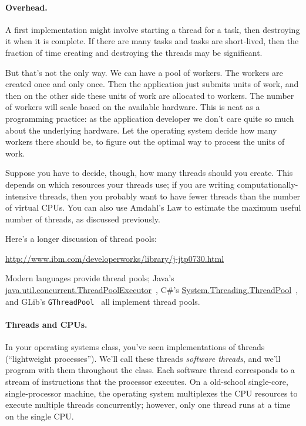 \documentclass[a4paper]{report}
\begin{document}
\paragraph{Overhead.}
A first implementation might involve starting a thread for a task, then destroying it when it is complete. If there are many tasks and tasks are short-lived, then the fraction of time creating and destroying the threads may be significant.

 But that's not the only way. We can have a pool of workers. The workers are created once and only once. Then the application just submits units of work, and then on the other side these units of work are allocated to workers. The number of workers will scale based on the available hardware. This is neat as a programming practice: as the application developer we don't care quite so much about the underlying hardware. Let the operating system decide how many workers there should be, to figure out the optimal way to process the units of work.
 
Suppose you have to decide, though, how many threads should you create.
This depends
on which resources your threads use; if you are writing
computationally-intensive threads, then you probably want to have
fewer threads than the number of virtual CPUs. You can also use
Amdahl's Law to estimate the maximum useful number of threads, as
discussed previously.

Here's a longer discussion of thread pools:

\begin{center}
\url{http://www.ibm.com/developerworks/library/j-jtp0730.html}
\end{center}

Modern languages provide thread pools; Java's
\url{java.util.concurrent.ThreadPoolExecutor}~\cite{java:threadpoolexecutor}, C\#'s
\url{System.Threading.ThreadPool}~\cite{csharp:threadpool}, and GLib's {\tt GThreadPool}~\cite{gnome:threadpool} all implement thread pools. 

\paragraph{Threads and CPUs.} In your operating systems class,
you've seen implementations of threads (``lightweight processes'').
We'll call these threads \emph{software threads}, and we'll program
with them throughout the class. Each software thread corresponds to a
stream of instructions that the processor executes. On a old-school
single-core, single-processor machine, the operating system
multiplexes the CPU resources to execute multiple threads
concurrently; however, only one thread runs at a time on the single
CPU.
\end{document}
